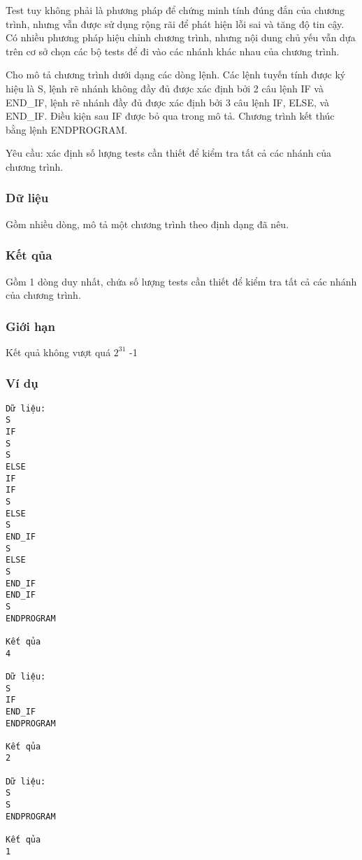 



   Test tuy không phải là phương pháp để chứng minh tính đúng đắn của chương trình, nhưng vẫn được sử dụng rộng rãi để phát hiện lỗi sai và tăng độ tin cậy. Có nhiều phương pháp hiệu chỉnh chương trình, nhưng nội dung chủ yếu vẫn dựa trên cơ sở chọn các bộ tests để đi vào các nhánh khác nhau của chương trình.  

   Cho mô tả chương trình dưới dạng các dòng lệnh. Các lệnh tuyến tính được ký hiệu là S, lệnh rẽ nhánh không đầy đủ được xác định bởi 2 câu lệnh IF và END\_IF, lệnh rẽ nhánh đầy đủ được xác định bởi 3 câu lệnh IF, ELSE, và END\_IF. Điều kiện sau IF được bỏ qua trong mô tả. Chương trình kết thúc bằng lệnh ENDPROGRAM.  

   Yêu cầu: xác định số lượng tests cần thiết để kiểm tra tất cả các nhánh của chương trình.  

\subsubsection{   Dữ liệu  }

   Gồm nhiều dòng, mô tả một chương trình theo định dạng đã nêu.  

\subsubsection{   Kết qủa  }

   Gồm 1 dòng duy nhất, chứa số lượng tests cần thiết để kiểm tra tất cả các nhánh của chương trình.  

\subsubsection{   Giới hạn  }

   Kết quả không vượt quá $2^{31}$   -1  

\subsubsection{   Ví dụ  }
\begin{verbatim}
Dữ liệu:
S
IF
S
S
ELSE
IF
IF
S
ELSE
S
END_IF
S
ELSE
S
END_IF
END_IF
S
ENDPROGRAM

Kết qủa
4

Dữ liệu:
S
IF
END_IF
ENDPROGRAM

Kết qủa
2

Dữ liệu:
S
S
ENDPROGRAM

Kết qủa
1
\end{verbatim}
